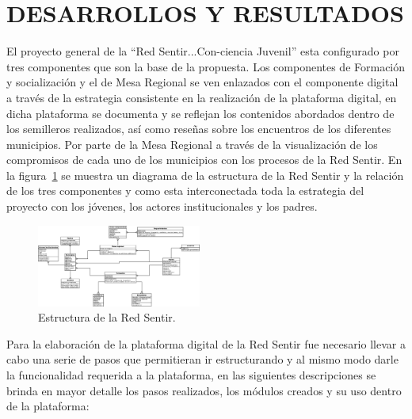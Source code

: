 \documentclass[journal,transmag]{IEEEtran}
\begin{document}
\section{DESARROLLOS Y RESULTADOS}\label{sec:resultados}

El proyecto general de la ``Red Sentir...Con-ciencia Juvenil'' esta configurado por tres componentes que son la base de la propuesta. Los componentes de Formación y socialización y el de Mesa Regional se ven enlazados con el componente digital a través de la estrategia consistente en la realización de la plataforma digital, en dicha plataforma se documenta y se reflejan los contenidos abordados dentro de los semilleros realizados, así como reseñas sobre los encuentros de los diferentes municipios. Por parte de la Mesa Regional a través de la visualización de los compromisos de cada uno de los municipios con los procesos de la Red Sentir. En la figura~\ref{fig:red} se muestra un diagrama de la estructura de la Red Sentir y la relación de los tres componentes y como esta interconectada toda la estrategia del proyecto con los jóvenes, los actores institucionales y los padres. 

\begin{figure}[t]
\centering
\includegraphics[width=0.48\textwidth]{red.eps}
\caption{Estructura de la Red Sentir.}
\label{fig:red}
\end{figure}

Para la elaboración de la plataforma digital de la Red Sentir fue necesario llevar a cabo una serie de pasos que permitieran ir estructurando y al mismo modo darle la funcionalidad requerida a la plataforma, en las siguientes descripciones se brinda en mayor detalle los pasos realizados, los módulos creados y su uso dentro de la plataforma:
\end{document}
